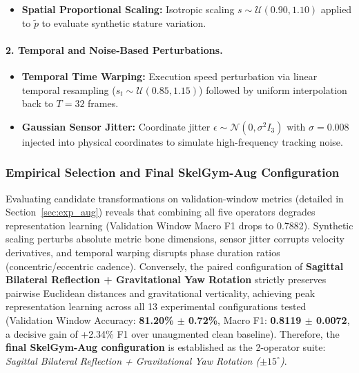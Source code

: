 \documentclass[preprint,12pt]{elsarticle}
\begin{document}
\begin{itemize}
\begin{equation}
    \end{equation}
    Because $R_y(\alpha)$ acts strictly within the transverse plane, vertical displacement remains invariant ($\Delta y' = \Delta y$) and horizontal Euclidean radius is identically preserved:
    \begin{equation}
    \label{eq:yaw_invariance}
        \Delta x'^2 + \Delta z'^2 = (\Delta x \cos\alpha + \Delta z \sin\alpha)^2 + (-\Delta x \sin\alpha + \Delta z \cos\alpha)^2 = \Delta x^2 + \Delta z^2.
    \end{equation}
    Consequently, elevation angles satisfy $\theta' = \theta$, preserving biological limb inclination relative to gravity while teaching the network horizontal viewpoint invariance.
    \item \textbf{Spatial Proportional Scaling:} Isotropic scaling $s \sim \mathcal{U}(0.90, 1.10)$ applied to $\tilde{p}$ to evaluate synthetic stature variation.
\end{itemize}

\paragraph{2. Temporal and Noise-Based Perturbations.}
\begin{itemize}
    \item \textbf{Temporal Time Warping:} Execution speed perturbation via linear temporal resampling ($s_t \sim \mathcal{U}(0.85, 1.15)$) followed by uniform interpolation back to $T=32$ frames.
    \item \textbf{Gaussian Sensor Jitter:} Coordinate jitter $\epsilon \sim \mathcal{N}(0, \sigma^2 I_3)$ with $\sigma = 0.008$ injected into physical coordinates to simulate high-frequency tracking noise.
\end{itemize}

\subsubsection{Empirical Selection and Final SkelGym-Aug Configuration}
Evaluating candidate transformations on validation-window metrics (detailed in Section~\ref{sec:exp_aug}) reveals that combining all five operators degrades representation learning (Validation Window Macro F1 drops to 0.7882). Synthetic scaling perturbs absolute metric bone dimensions, sensor jitter corrupts velocity derivatives, and temporal warping disrupts phase duration ratios (concentric/eccentric cadence). Conversely, the paired configuration of \textbf{Sagittal Bilateral Reflection + Gravitational Yaw Rotation} strictly preserves pairwise Euclidean distances and gravitational verticality, achieving peak representation learning across all 13 experimental configurations tested (Validation Window Accuracy: \textbf{81.20\% $\pm$ 0.72\%}, Macro F1: \textbf{0.8119 $\pm$ 0.0072}, a decisive gain of +2.34\% F1 over unaugmented clean baseline). Therefore, the \textbf{final SkelGym-Aug configuration} is established as the 2-operator suite: \textit{Sagittal Bilateral Reflection + Gravitational Yaw Rotation ($\pm 15^\circ$)}.
\end{document}
